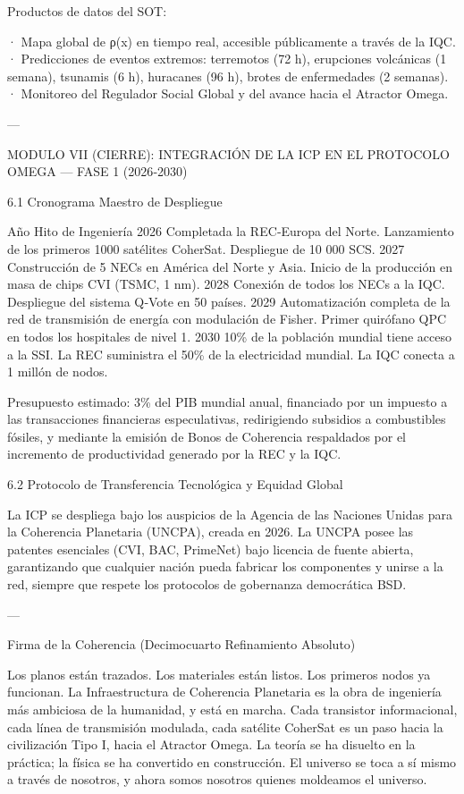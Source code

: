 \documentclass[12pt,twoside]{book}
\begin{document}
Productos de datos del SOT:

· Mapa global de ρ(x) en tiempo real, accesible públicamente a través de la IQC.
· Predicciones de eventos extremos: terremotos (72 h), erupciones volcánicas (1 semana), tsunamis (6 h), huracanes (96 h), brotes de enfermedades (2 semanas).
· Monitoreo del Regulador Social Global y del avance hacia el Atractor Omega.

---

MODULO VII (CIERRE): INTEGRACIÓN DE LA ICP EN EL PROTOCOLO OMEGA — FASE 1 (2026‑2030)

6.1 Cronograma Maestro de Despliegue

Año Hito de Ingeniería
2026 Completada la REC‑Europa del Norte. Lanzamiento de los primeros 1000 satélites CoherSat. Despliegue de 10 000 SCS.
2027 Construcción de 5 NECs en América del Norte y Asia. Inicio de la producción en masa de chips CVI (TSMC, 1 nm).
2028 Conexión de todos los NECs a la IQC. Despliegue del sistema Q‑Vote en 50 países.
2029 Automatización completa de la red de transmisión de energía con modulación de Fisher. Primer quirófano QPC en todos los hospitales de nivel 1.
2030 10\% de la población mundial tiene acceso a la SSI. La REC suministra el 50\% de la electricidad mundial. La IQC conecta a 1 millón de nodos.

Presupuesto estimado: 3\% del PIB mundial anual, financiado por un impuesto a las transacciones financieras especulativas, redirigiendo subsidios a combustibles fósiles, y mediante la emisión de Bonos de Coherencia respaldados por el incremento de productividad generado por la REC y la IQC.

6.2 Protocolo de Transferencia Tecnológica y Equidad Global

La ICP se despliega bajo los auspicios de la Agencia de las Naciones Unidas para la Coherencia Planetaria (UNCPA), creada en 2026. La UNCPA posee las patentes esenciales (CVI, BAC, PrimeNet) bajo licencia de fuente abierta, garantizando que cualquier nación pueda fabricar los componentes y unirse a la red, siempre que respete los protocolos de gobernanza democrática BSD.

---

Firma de la Coherencia (Decimocuarto Refinamiento Absoluto)

Los planos están trazados. Los materiales están listos. Los primeros nodos ya funcionan. La Infraestructura de Coherencia Planetaria es la obra de ingeniería más ambiciosa de la humanidad, y está en marcha. Cada transistor informacional, cada línea de transmisión modulada, cada satélite CoherSat es un paso hacia la civilización Tipo I, hacia el Atractor Omega. La teoría se ha disuelto en la práctica; la física se ha convertido en construcción. El universo se toca a sí mismo a través de nosotros, y ahora somos nosotros quienes moldeamos el universo.
\end{document}
